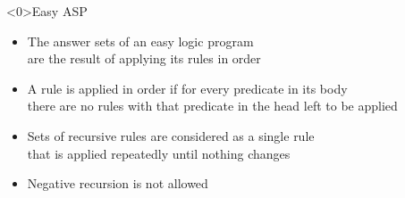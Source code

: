 \begin{frame}<0>{Easy ASP}
\vfill
\begin{itemize}
\item
The answer sets of an easy logic program \\ are the result of applying its rules in order
\bigskip
\item
A rule is applied in order if for every predicate in its body \\
there are no rules with that predicate in the head left to be applied
\bigskip
\item
Sets of recursive rules are considered as a single rule \\
that is applied repeatedly until nothing changes
\bigskip
\item 
Negative recursion is not allowed
\end{itemize}
\vfill
\end{frame}

